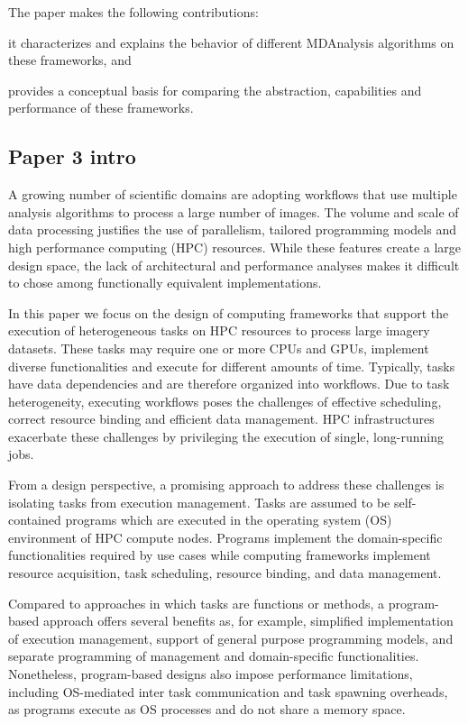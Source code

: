 The paper makes the following contributions: 
\begin{inparaenum}[i)]
    \item it characterizes and explains the behavior of different MDAnalysis algorithms on these frameworks, and
    \item provides a conceptual basis for comparing the abstraction, capabilities and performance of these frameworks.
\end{inparaenum}

\subsection*{Paper 3 intro}
A growing number of scientific domains are adopting workflows that use multiple analysis algorithms to process a large number of images.
The volume and scale of data processing justifies the use of parallelism, tailored programming models and high performance computing (HPC) resources.
While these features create a large design space, the lack of architectural and performance analyses makes it difficult to chose among functionally equivalent implementations.

In this paper we focus on the design of computing frameworks that support the execution of heterogeneous tasks on HPC resources to process large imagery datasets.
These tasks may require one or more CPUs and GPUs, implement diverse functionalities and execute for different amounts of time.
Typically, tasks have data dependencies and are therefore organized into workflows.
Due to task heterogeneity, executing workflows poses the challenges of effective scheduling, correct resource binding and efficient data management.
HPC infrastructures exacerbate these challenges by privileging the execution of single, long-running jobs.

From a design perspective, a promising approach to address these challenges is isolating tasks from execution management.
Tasks are assumed to be self-contained programs which are executed in the operating system (OS) environment of HPC compute nodes.
Programs implement the domain-specific functionalities required by use cases while computing frameworks implement resource acquisition, task scheduling, resource binding, and data management.

Compared to approaches in which tasks are functions or methods, a program-based approach offers several benefits as, for example, simplified implementation of execution management, support of general purpose programming models, and separate programming of management and domain-specific functionalities.
Nonetheless, program-based designs also impose performance limitations, including OS-mediated inter task communication and task spawning overheads, as programs execute as OS processes and do not share a memory space.

